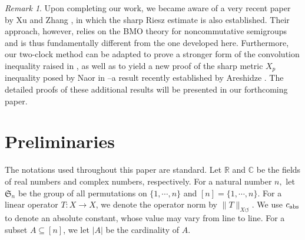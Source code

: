 \documentclass{amsart}
\numberwithin{equation}{section}
\theoremstyle{definition}
\theoremstyle{remark}
\newtheorem{rem}[thm]{Remark}
\newcommand{\1}{\mathbf 1}
\begin{document}
\begin{rem}
Upon completing our work, we became aware of a very recent paper
by Xu and Zhang \cite{XuZhang}, in which the sharp Riesz estimate is also established. Their
approach, however, relies on the BMO theory for noncommutative semigroups and is thus fundamentally different from the one developed here. Furthermore, our two-clock
method can be adapted to prove a stronger form of the convolution inequality
raised in \cite[Question 6.1]{NS2016}, as well as to yield a new proof of the sharp metric $X_p$
inequality posed by Naor in \cite{Naor2016}--a result recently established by Areshidze \cite{Are2026}.
The detailed proofs of these additional results will be presented in our forthcoming
paper.
\end{rem}

%
\section{Preliminaries}\label{sec:preliminaries}

The notations used throughout this paper are standard. Let $\mathbb{R}$ and $\mathbb{C}$ be the fields of real numbers and complex numbers, respectively. For a natural number $n,$ let $\mathfrak{S}_n$ be the group of all permutations on $\{1,\cdots,n\}$ and $[n]=\{1,\cdots,n\}$. For a linear operator $T:X\to X$, we denote the operator norm by $\|T\|_{X\circlearrowleft}$. We use $c_{\rm abs}$ to denote an absolute constant, whose value may vary from line to line. For a subset $A\subseteq [n]$, we let $|A|$ be the cardinality of $A$.
\end{document}
